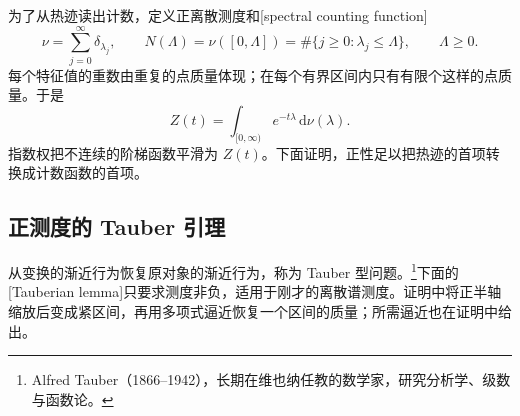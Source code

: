 \ProseParagraphBreak

为了从热迹读出计数，定义正离散测度和[spectral counting function]
\begin{equation}\label{g3:eq:spectral-counting-measure}
	\nu=\sum_{j=0}^{\infty}\delta_{\lambda_j},\qquad
	N(\Lambda)=\nu([0,\Lambda])
	=\#\{j\ge0:\lambda_j\le\Lambda\},\qquad \Lambda\ge0.
\end{equation}
每个特征值的重数由重复的点质量体现；在每个有界区间内只有有限个这样的点质量。于是
\[
	Z(t)=\int_{[0,\infty)}e^{-t\lambda}\,\mathrm d\nu(\lambda).
\]
指数权把不连续的阶梯函数平滑为 \(Z(t)\)。下面证明，正性足以把热迹的首项转换成计数函数的首项。

\subsection{正测度的 Tauber 引理}
\label{g3:subsec:1603:03}
从变换的渐近行为恢复原对象的渐近行为，称为 Tauber 型问题。\footnote{Alfred Tauber（1866--1942），长期在维也纳任教的数学家，研究分析学、级数与函数论。}下面的[Tauberian lemma]只要求测度非负，适用于刚才的离散谱测度。证明中将正半轴缩放后变成紧区间，再用多项式逼近恢复一个区间的质量；所需逼近也在证明中给出。

